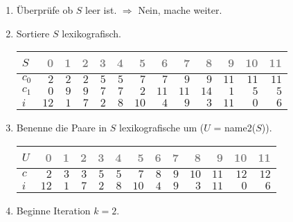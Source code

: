 \begin{enumerate}
\item 
Überprüfe ob $S$ leer ist.
$\Rightarrow$ Nein, mache weiter.

\item 
Sortiere $S$ lexikografisch.
\begin{center}
\small\begin{tabular}{lrrrrrrrrrrrr}
    \toprule 
    $S$ & \textcolor{gray}{0} & \textcolor{gray}{1} & \textcolor{gray}{2} & \textcolor{gray}{3} & \textcolor{gray}{4} & \textcolor{gray}{5} & \textcolor{gray}{6} & \textcolor{gray}{7} & \textcolor{gray}{8} & \textcolor{gray}{9} & \textcolor{gray}{10} & \textcolor{gray}{11}\\
    \midrule 
    $c_0$ & $2$ & $2$ & $2$ & $5$ & $5$ & $7$ & $7$ & $9$ & $9$ & $11$ & $11$ & $11$ \\
    $c_1$ & $0$ & $9$ & $9$ & $7$ & $7$ & $2$ & $11$ & $11$ & $14$ & $1$ & $5$ & $5$ \\
    $i$ & $12$ & $1$ & $7$ & $2$ & $8$ & $10$ & $4$ & $9$ & $3$ & $11$ & $0$ & $6$ \\
    \bottomrule 
\end{tabular}
\end{center}

\item 
Benenne die Paare in $S$ lexikografische um ($U$ = name2($S$)).
\begin{center}
\small\begin{tabular}{lrrrrrrrrrrrr}
    \toprule 
    $U$ & \textcolor{gray}{0} & \textcolor{gray}{1} & \textcolor{gray}{2} & \textcolor{gray}{3} & \textcolor{gray}{4} & \textcolor{gray}{5} & \textcolor{gray}{6} & \textcolor{gray}{7} & \textcolor{gray}{8} & \textcolor{gray}{9} & \textcolor{gray}{10} & \textcolor{gray}{11}\\
    \midrule 
    $c$ & $2$ & $3$ & $3$ & $5$ & $5$ & $7$ & $8$ & $9$ & $10$ & $11$ & $12$ & $12$ \\
    $i$ & $12$ & $1$ & $7$ & $2$ & $8$ & $10$ & $4$ & $9$ & $3$ & $11$ & $0$ & $6$ \\
    \bottomrule 
\end{tabular}
\end{center}
\item 
Beginne Iteration $k = 2$.


\end{enumerate}
